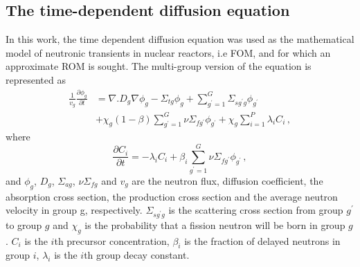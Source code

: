\documentclass[]{interact}
\theoremstyle{plain}%
\theoremstyle{definition}
\theoremstyle{remark}
\begin{document}
\subsection{The time-dependent diffusion equation}
\label{sec:fom}
In this work, the time dependent diffusion equation was used as the mathematical model of neutronic transients in nuclear reactors, i.e FOM, and for which an approximate ROM is sought.
The multi-group version of the equation is represented as
\begin{equation}
	\begin{split}
	\frac{1}{v_g} \frac{\partial\phi_g}{\partial t} &= 
	\nabla. D_g\nabla\phi_g - \Sigma_{tg}\phi_g + \sum_{g^\prime=1}^{G}{\Sigma_{sg^\prime g}}\phi_{g^\prime} \\
	&+ \chi_g(1-\beta)\sum_{g^\prime = 1}^{G}\nu\Sigma_{fg^\prime}\phi_{g^\prime}  
	+ \chi_g\sum_{i=1}^{P} \lambda_i C_i \, ,
	\end{split}
	\label{time_diff}
\end{equation}
where 
\begin{equation*}
	\frac{\partial C_i}{\partial t} = -\lambda_i C_i + \beta_i \sum_{g^\prime=1}^{G} \nu\Sigma_{fg^\prime} \phi_{g^\prime} \, ,
\end{equation*}
and $\phi_g$, $D_g$, $\Sigma_{ag}$, $\nu\Sigma_{fg}$ and $v_g$ are the neutron flux, diffusion coefficient, the absorption cross section, the production cross section and the average neutron velocity in group g, respectively. $\Sigma_{sg^\prime g}$ is the scattering cross section from group $g^\prime$ to group $g$ 
and $\chi_g$ is the probability that a fission neutron will be born in group $g$.
$C_i$ is the $i$th precursor concentration, $\beta_i$ is the fraction of delayed neutrons in group $i$, $\lambda_i$ is the $i$th group decay constant.
\end{document}
